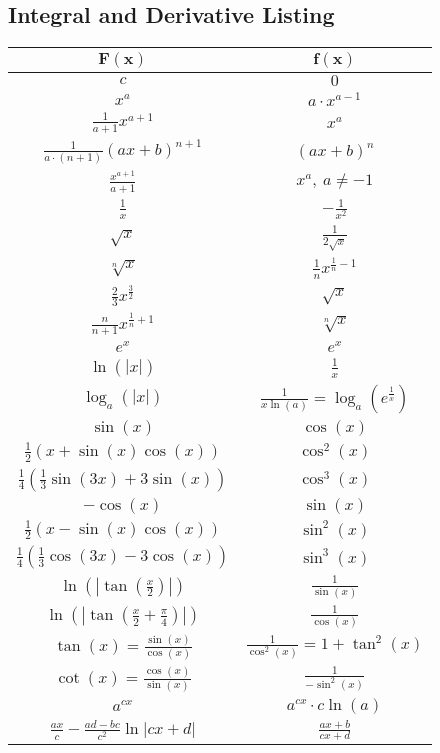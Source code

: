 \subsection{Integral and Derivative Listing}
\begin{tabular}{c|c}
  $\mathbf{F(x)}$ & $\mathbf{f(x)}$ \\
  \midrule
  $c$ & $0$ \\
  $x^a$ & $a \cdot x^{a - 1}$ \\
  $\frac{1}{a+1} x^{a + 1}$ & $x^a$ \\
  $\frac{1}{a \cdot (n + 1)} (ax + b)^{n + 1}$ & $(ax + b)^n$ \\
  $\frac{x^{a + 1}}{a + 1}$ & $x^a, \ a \neq -1$ \\
  $\frac{1}{x}$ & $-\frac{1}{x^2}$ \\
  $\sqrt{x}$ & $\frac{1}{2\sqrt{x}}$ \\
  $\sqrt[n]{x}$ & $\frac{1}{n}x^{\frac{1}{n} - 1}$ \\
  $\frac{2}{3}x^{\frac{3}{2}}$ & $\sqrt{x}$ \\
  $\frac{n}{n+1} x^{\frac{1}{n} + 1}$ & $\sqrt[n]{x}$ \\
  $e^x$ & $e^x$ \\
  $\ln(|x|)$ & $\frac{1}{x}$ \\
  $\log_a(|x|)$ & $\frac{1}{x \ln(a)} = \log_a(e^\frac{1}{x})$ \\
  $\sin(x)$ & $\cos(x)$ \\
  $\frac{1}{2} (x + \sin(x) \cos(x))$ & $\cos^2(x)$ \\
  $\frac{1}{4}(\frac{1}{3}\sin(3x) + 3\sin(x))$ & $\cos^3(x)$ \\
  $-\cos(x)$ & $\sin(x)$ \\
  $\frac{1}{2} (x - \sin(x) \cos(x))$ & $\sin^2(x)$ \\
  $\frac{1}{4}(\frac{1}{3}\cos(3x) - 3\cos(x))$ & $\sin^3(x)$ \\
  $\ln\left(\left|\tan\left(\frac{x}{2}\right)\right|\right)$ & $\frac{1}{\sin(x)}$ \\
  $\ln\left(\left|\tan(\frac{x}{2} + \frac{\pi}{4})\right|\right)$ & $\frac{1}{\cos(x)}$ \\
  $\tan(x) = \frac{\sin(x)}{\cos(x)}$ & $\frac{1}{\cos^2(x)} = 1 + \tan^2(x)$ \\
  $\cot(x) = \frac{\cos(x)}{\sin(x)}$ & $\frac{1}{-\sin^2(x)}$ \\
  $a^{cx}$ & $a^{cx} \cdot c \ln(a)$ \\
  $\frac{ax}{c} - \frac{ad-bc}{c^2} \ln |cx +d|$ & $\frac{ax+b}{cx+d}$ \\

\end{tabular}
